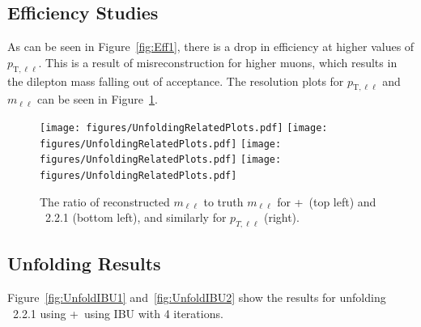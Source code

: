 
\subsection{Efficiency Studies}

As can be seen in Figure~\ref{fig:Eff1}, there is a drop in efficiency at higher values of $p_{\text{T},\ell\ell}$. This is a result of \pt misreconstruction for higher \pt muons, which results in the dilepton mass falling out of acceptance.
The resolution plots for $p_{\text{T},\ell\ell}$ and $m_{\ell\ell}$ can be seen in Figure~\ref{fig:Resmll}.

\begin{figure}
  \centering
  \texttt{[image: figures/UnfoldingRelatedPlots.pdf]}
  \texttt{[image: figures/UnfoldingRelatedPlots.pdf]}
  \texttt{[image: figures/UnfoldingRelatedPlots.pdf]}
  \texttt{[image: figures/UnfoldingRelatedPlots.pdf]}
  \caption{The ratio of reconstructed $m_{\ell\ell}$ to truth $m_{\ell\ell}$ for \powheg+\pythia~(top left) and \sherpa~2.2.1 (bottom left), and similarly for $p_{T,\ell\ell}$ (right).}
  \label{fig:Resmll}
\end{figure}

\subsection{Unfolding Results}
Figure~\ref{fig:UnfoldIBU1} and~\ref{fig:UnfoldIBU2} show the results for unfolding \sherpa~2.2.1 using \powheg+\pythia~using IBU with 4 iterations.

